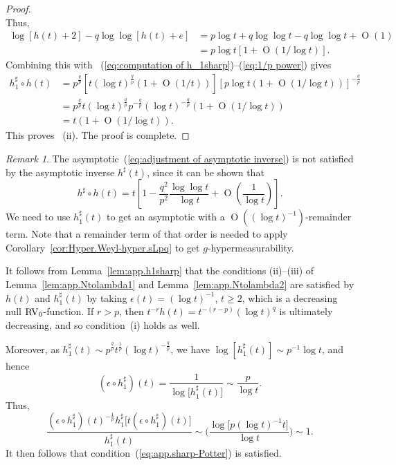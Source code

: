 \documentclass[10pt, a4paper]{amsart}
\newcommand{\op}{\operatorname}
\numberwithin{equation}{section}
\theoremstyle{definition}
\theoremstyle{remark}
\newtheorem{remark}[theorem]{Remark}
\newcommand{\RV}{\textup{RV}}
\begin{document}
\begin{proof}
\begin{equation*}
\end{equation*}
Thus,
\begin{align*}
\log[h(t)+2]-q\log\log[h(t)+e]
&=p\log t+q\log\log t-q\log\log t+\op{O}(1)\\
&=p\log t[1+\op{O}(1/{\log t})].
\end{align*}
Combining this with ~(\ref{eq:computation of h_1sharp})--(\ref{eq:1/p power}) gives
\begin{align*}
h_1^\sharp\circ h(t)&=p^{\frac{q}{p}}[t(\log t)^{\frac{q}{p}}(1+\op{O}(1/t))] [p\log t(1+\op{O}(1/{\log t}))]^{-\frac{q}{p}}\\
&=p^{\frac{q}{p}}t(\log t)^{\frac{q}{p}}p^{-\frac{q}{p}}(\log t)^{-\frac{q}{p}}(1+\op{O}(1/{\log t}))\\
&=t(1+\op{O}(1/{\log t})).
\end{align*}
This proves ~(ii). The proof is complete.
\end{proof}

\begin{remark}
The asymptotic~(\ref{eq:adjustment of asymptotic inverse}) is not satisfied by the asymptotic inverse $h^\sharp(t)$, since it can be shown that
\begin{equation*}
  h^\sharp \circ h(t)=t \left[ 1 - \frac{q^2}{p^2}\frac{\log \log t}{\log t}+\op{O}\left(\frac{1}{\log t}\right) \right] .
\end{equation*}
We need to use  $h_1^\sharp(t)$ to get an asymptotic with a $\op{O}((\log t)^{-1})$-remainder term. Note that a remainder term of that order is needed to apply Corollary~\ref{cor:Hyper.Weyl-hyper.sLpq} to get $g$-hypermeasurability.
\end{remark}

It follows from Lemma~\ref{lem:app.h1sharp} that the conditions (ii)--(iii) of Lemma~\ref{lem:app.Ntolambda1} and  Lemma~\ref{lem:app.Ntolambda2} are satisfied by $h(t)$ and $h_1^\sharp(t)$ by taking $\epsilon(t)=(\log t)^{-1}$, $t\geq 2$, which is a  decreasing null $\RV_0$-function. If $r>p$, then $t^{-r}h(t)=t^{-(r-p)}(\log t)^q$ is ultimately decreasing, and so condition~(i) holds as well. 


Moreover, as $h_1^\sharp(t)\sim p^{\frac{q}{p}} t^{\frac{1}{p}}(\log t)^{-\frac{q}{p}}$, we have $\log [h_1^\sharp(t)]\sim p^{-1}\log t$, and hence
\begin{equation}\label{eq:app.epsilonh1sharp-log-example}
( \epsilon\circ h_1^\sharp)(t)= \frac{1}{\log \big[h_1^\sharp(t)\big]}\sim \frac{p}{\log t}. 
\end{equation}
Thus, 
\begin{equation*}
 \frac{(\epsilon \circ h_1^\sharp)(t)^{-\frac{1}{p}}h_1^\sharp\big[ t (\epsilon \circ h_1^\sharp)(t)\big] }{h_1^\sharp(t)}\sim \bigg( \frac{ \log \big[p(\log t)^{-1}t\big]}{\log t} \bigg)\sim 1. 
\end{equation*}
It then follows that condition~(\ref{eq:app.sharp-Potter}) is satisfied. 
\end{document}
